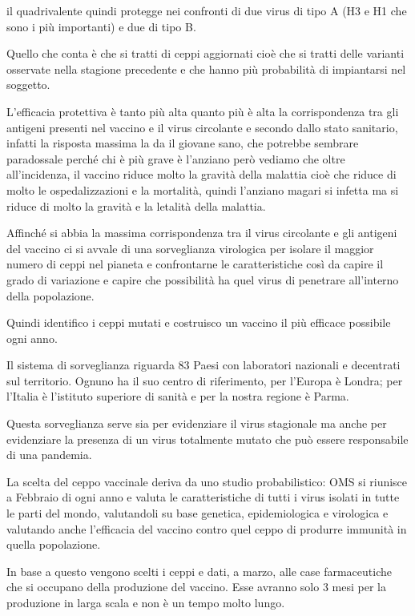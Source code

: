 il quadrivalente quindi protegge nei confronti di due virus di tipo A
(H3 e H1 che sono i più importanti) e due di tipo B.

Quello che conta è che si tratti di ceppi aggiornati cioè che si tratti
delle varianti osservate nella stagione precedente e che hanno più
probabilità di impiantarsi nel soggetto.

L'efficacia protettiva è tanto più alta quanto più è alta la
corrispondenza tra gli antigeni presenti nel vaccino e il virus
circolante e secondo dallo stato sanitario, infatti la risposta massima
la da il giovane sano, che potrebbe sembrare paradossale perché chi è
più grave è l'anziano però vediamo che oltre all'incidenza, il vaccino
riduce molto la gravità della malattia cioè che riduce di molto le
ospedalizzazioni e la mortalità, quindi l'anziano magari si infetta ma
si riduce di molto la gravità e la letalità della malattia.

Affinché si abbia la massima corrispondenza tra il virus circolante e
gli antigeni del vaccino ci si avvale di una sorveglianza virologica per
isolare il maggior numero di ceppi nel pianeta e confrontarne le
caratteristiche così da capire il grado di variazione e capire che
possibilità ha quel virus di penetrare all'interno della popolazione.

Quindi identifico i ceppi mutati e costruisco un vaccino il più efficace
possibile ogni anno.

Il sistema di sorveglianza riguarda 83 Paesi con laboratori nazionali e
decentrati sul territorio. Ognuno ha il suo centro di riferimento, per
l'Europa è Londra; per l'Italia è l'istituto superiore di sanità e per
la nostra regione è Parma.

Questa sorveglianza serve sia per evidenziare il virus stagionale ma
anche per evidenziare la presenza di un virus totalmente mutato che può
essere responsabile di una pandemia.

La scelta del ceppo vaccinale deriva da uno studio probabilistico: OMS
si riunisce a Febbraio di ogni anno e valuta le caratteristiche di tutti
i virus isolati in tutte le parti del mondo, valutandoli su base
genetica, epidemiologica e virologica e valutando anche l'efficacia del
vaccino contro quel ceppo di produrre immunità in quella popolazione.

In base a questo vengono scelti i ceppi e dati, a marzo, alle case
farmaceutiche che si occupano della produzione del vaccino. Esse avranno
solo 3 mesi per la produzione in larga scala e non è un tempo molto
lungo.

